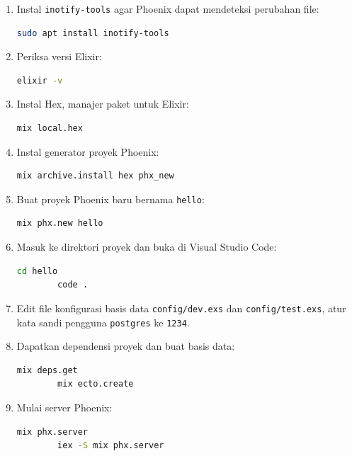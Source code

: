 \begin{enumerate}
	\item Instal \texttt{inotify-tools} agar Phoenix dapat mendeteksi perubahan file:
	\begin{lstlisting}[language=bash]
		sudo apt install inotify-tools
	\end{lstlisting}
	
	\item Periksa versi Elixir:
	\begin{lstlisting}[language=bash]
		elixir -v
	\end{lstlisting}
	
	\item Instal Hex, manajer paket untuk Elixir:
	\begin{lstlisting}[language=bash]
		mix local.hex
	\end{lstlisting}
	
	\item Instal generator proyek Phoenix:
	\begin{lstlisting}[language=bash]
		mix archive.install hex phx_new
	\end{lstlisting}
	
	\item Buat proyek Phoenix baru bernama \texttt{hello}:
	\begin{lstlisting}[language=bash]
		mix phx.new hello
	\end{lstlisting}
	
	\item Masuk ke direktori proyek dan buka di Visual Studio Code:
	\begin{lstlisting}[language=bash]
		cd hello
		code .
	\end{lstlisting}
	
	\item Edit file konfigurasi basis data \texttt{config/dev.exs} dan \texttt{config/test.exs}, atur kata sandi pengguna \texttt{postgres} ke \texttt{1234}.
	
	\item Dapatkan dependensi proyek dan buat basis data:
	\begin{lstlisting}[language=bash]
		mix deps.get
		mix ecto.create
	\end{lstlisting}
	
	\item Mulai server Phoenix:
	\begin{lstlisting}[language=bash]
		mix phx.server
		iex -S mix phx.server
	\end{lstlisting}
\end{enumerate}

